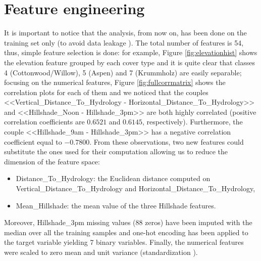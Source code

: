 \section{Feature engineering}
\label{sec:feat_eng}
It is important to notice that the analysis, from now on, has been done on the training set only (to avoid data leakage \cite{smialowski2009}). The total number of features is 54, thus, simple feature selection is done: for example, Figure \ref{fig:elevationhist} shows the elevation feature grouped by each cover type and it is quite clear that classes 4 (Cottonwood/Willow), 5 (Aspen) and 7 (Krummholz) are easily separable; focusing on the numerical features, Figure \ref{fig:fullcorrmatrix} shows the correlation plots for each of them and we noticed that the couples <<Vertical\_Distance\_To\_Hydrology - Horizontal\_Distance\_To\_Hydrology>> and <<Hillshade\_Noon - Hillshade\_3pm>> are both highly correlated (positive correlation coefficients are $0.6521$ and $0.6145$, respectively). Furthermore, the couple <<Hillshade\_9am - Hillshade\_3pm>> has a negative correlation coefficient equal to $-0.7800$. From these observations, two new features could substitute the ones used for their computation allowing us to reduce the dimension of the feature space:
\begin{itemize}
\item Distance\_To\_Hydrology: the Euclidean distance computed on Vertical\_Distance\_To\_Hydrology and Horizontal\_Distance\_To\_Hydrology,
\item Mean\_Hillshade: the mean value of the three Hillshade features.
\end{itemize}
Moreover, Hillshade\_3pm missing values ($88$ zeros) have been imputed with the median over all the training samples and one-hot encoding has been applied to the target variable yielding 7 binary variables. Finally, the numerical features were scaled to zero mean and unit variance (standardization \cite{wiki:standardization}).
